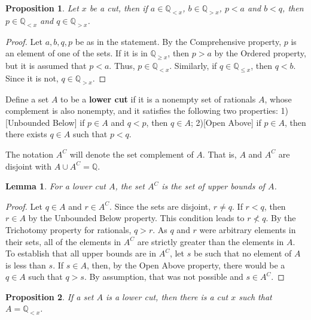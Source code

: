 \documentclass[12pt]{article}
\newtheorem{lemma}{Lemma}[section]
\newtheorem{proposition}{Proposition}[section]
\newcommand{\qcut}[2][x]{\ensuremath{\mathbb{Q}_{#2 #1}}}
\newcommand{\qlt}[1][x]{\qcut[#1]{<}}
\newcommand{\qgt}[1][x]{\qcut[#1]{>}}
\newcommand{\qgeq}[1][x]{\qcut[#1]{\geq}}
\newcommand{\qleq}[1][x]{\qcut[#1]{\leq}}
\begin{document}
\begin{proposition}\label{br:cut-unbounded}
    Let $x$ be a cut, then if $a \in \qlt$, $b \in \qgt$, $p < a$ and $b < q$, then $p \in \qlt$ and $q \in \qgt$.
\end{proposition}

\begin{proof}
    Let $a,b, q, p$ be as in the statement. By the Comprehensive property, $p$ is an element of one of the sets. If it is in $\qgeq$, then $p > a$ by the Ordered property, but it is assumed that $p < a$. Thus, $p \in \qlt$. Similarly, if $q \in \qleq$, then $q < b$. Since it is not, $q \in \qgt$. 
\end{proof}

Define a set $A$ to be a \textbf{lower cut} if it is a nonempty set of rationals $A$, whose complement is also nonempty, and it satisfies the following two properties: 1) [Unbounded Below] if $p \in A$ and $q < p$, then $q \in A$; 2)[Open Above] if $p \in A$, then there exists $q \in A$ such that $p < q$.

The notation $A^C$ will denote the set complement of $A$. That is, $A$ and $A^C$ are disjoint with $A \cup A^C = \mathbb{Q}$.

\begin{lemma}
    For a lower cut $A$, the set $A^C$ is the set of upper bounds of $A$.
\end{lemma}

\begin{proof}
    Let $q \in A$ and $r \in A^C$. Since the sets are disjoint, $r \neq q$. If $r < q$, then $r \in A$ by the Unbounded Below property. This condition leads to $r \nless q$. By the Trichotomy property for rationals, $q > r$. As $q$ and $r$ were arbitrary elements in their sets, all of the elements in $A^C$ are strictly greater than the elements in $A$. To establish that all upper bounds are in $A^C$, let $s$ be such that no element of $A$ is less than $s$. If $s \in A$, then, by the Open Above property, there would be a $q \in A$ such that $q > s$. By assumption, that was not possible and $s \in A^C$. 
\end{proof}


\begin{proposition}
    If a set $A$ is a lower cut, then there is a cut $x$ such that $A = \qlt$.
\end{proposition}
\end{document}
